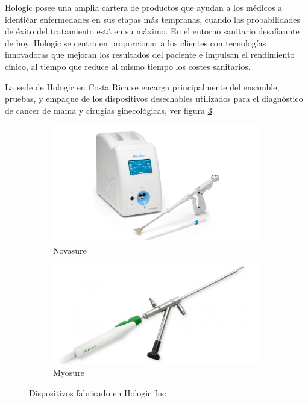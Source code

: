 \documentclass[12pt, twoside, letterpaper]{book}
\begin{document}
Hologic posee una amplia cartera de productos que ayudan a los m\'edicos a identi\'car
enfermedades en sus etapas m\'as tempranas, cuando las probabilidades de \'exito del tratamiento
est\'a en su m\'aximo. En el entorno sanitario desafiannte de hoy, Hologic se centra
en proporcionar a los clientes con tecnolog\'ias innovadoras que mejoran los resultados del
paciente e impulsan el rendimiento c\'inico, al tiempo que reduce al mismo tiempo los
costes sanitarios. \par

La sede de Hologic en Costa Rica se encarga principalmente del ensamble, pruebas, y
empaque de los dispositivos desechables utilizados para el diagn\'ostico de cancer de mama
y cirug\'ias ginecol\'ogicas, ver figura \ref{fig:Novasure}.

\begin{figure}[ht]
    \centering
    \begin{subfigure}[b]{0.45\textwidth}
        \centering
        \includegraphics[width=\textwidth]{Novasure}
        \caption{Novasure}
        \label{fig:nova}
    \end{subfigure}
    \hfill
    \begin{subfigure}[b]{0.45\textwidth}
        \centering
        \includegraphics[width=\textwidth]{myosure}
        \caption{Myosure}
        \label{fig:myo}
    \end{subfigure}
    \caption{Dispositivos fabricado en Hologic Inc}
    \label{fig:Novasure}
\end{figure}
\end{document}
